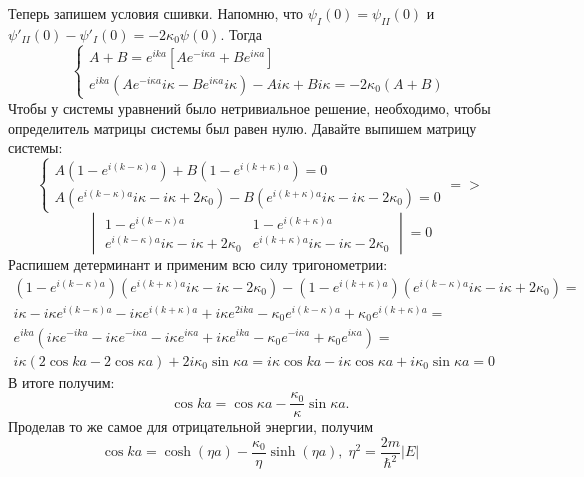 Теперь запишем условия сшивки. Напомню, что $\psi_I(0) = \psi_{II}(0)$ и $\psi'_{II}(0) - \psi'_I(0) = -2\kappa_0\psi(0)$. Тогда
\[
\begin{cases}
A + B = e^{ika}\left[Ae^{-i\kappa a} + Be^{i\kappa a}\right]\\
e^{ika}(Ae^{-i\kappa a}i\kappa - Be^{i\kappa a}i\kappa) - Ai\kappa + Bi\kappa = -2\kappa_0(A+B)
\end{cases}
\]
Чтобы у системы уравнений было нетривиальное решение, необходимо, чтобы определитель матрицы системы был равен нулю. Давайте выпишем матрицу системы:
\[
\begin{cases}
A(1 - e^{i(k-\kappa)a}) + B(1 - e^{i(k+\kappa)a}) = 0\\
A(e^{i(k-\kappa)a}i\kappa - i\kappa + 2\kappa_0) - B(e^{i(k+\kappa)a}i\kappa - i\kappa - 2\kappa_0) = 0
\end{cases}
=>
\]
\[
\begin{vmatrix}
1 - e^{i(k-\kappa)a} & 1 - e^{i(k+\kappa)a} \\
e^{i(k-\kappa)a}i\kappa - i\kappa + 2\kappa_0 & e^{i(k+\kappa)a}i\kappa - i\kappa - 2\kappa_0
\end{vmatrix}
= 0
\]
Распишем детерминант и применим всю силу тригонометрии:
\begin{multline*}
(1 - e^{i(k-\kappa)a})(e^{i(k+\kappa)a}i\kappa - i\kappa - 2\kappa_0) - (1 - e^{i(k+\kappa)a})(e^{i(k-\kappa)a}i\kappa - i\kappa + 2\kappa_0) = \\
i\kappa - i\kappa e^{i(k-\kappa)a} - i\kappa e^{i(k+\kappa)a} + i\kappa e^{2ika} - \kappa_0 e^{i(k-\kappa)a} + \kappa_0 e^{i(k+\kappa)a} = \\
e^{ika}\left( i\kappa e^{-ika} - i\kappa e^{-i\kappa a} - i\kappa e^{i\kappa a} + i\kappa e^{ika} - \kappa_0 e^{-i\kappa a} + \kappa_0 e^{i\kappa a}\right) = \\
i\kappa\left( 2\cos ka - 2\cos\kappa a \right) + 2i\kappa_0\sin\kappa a = i\kappa\cos ka - i\kappa\cos\kappa a + i\kappa_0\sin\kappa a = 0
\end{multline*}
В итоге получим:
\[
\cos ka = \cos\kappa a - \frac{\kappa_0}{\kappa}\sin\kappa a.
\]
Проделав то же самое для отрицательной энергии, получим
\[
\cos ka = \cosh(\eta a) - \frac{\kappa_0}{\eta}\sinh(\eta a), \; \eta^2 = \frac{2m}{\hbar^2}|E|
\]
